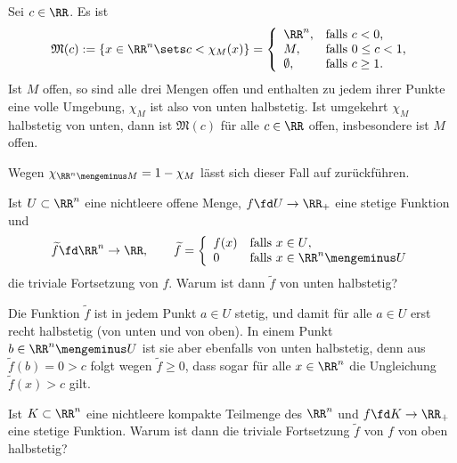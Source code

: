 \begin{antwort}
   Sei $c\in \RR$. Es ist 
  \[
  \mathfrak{M}(c) := \{ x\in \RR^n \sets c < \chi_M(x) \} = \left\{ 
    \begin{array}{lll} \RR^n, & \text{falls $c<0$,} \\
      M, & \text{falls $0\le c < 1$,} \\
      \emptyset, & \text{falls $c \ge 1$.}
    \end{array}\right.
  \]
  Ist $M$ offen, so sind alle drei Mengen offen und enthalten 
  zu jedem ihrer Punkte eine volle Umgebung, $\chi_M$ ist also 
  von unten halbstetig. Ist umgekehrt $\chi_M$ halbstetig 
  von unten, dann ist $\mathfrak{M}(c)$ für alle $c \in \RR$ offen, 
  insbesondere ist $M$ offen. 

   Wegen $\chi_{\RR^n\mengeminus M}=1-\chi_M$ lässt sich dieser 
  Fall auf  zurückführen.\AntEnd
  
\end{antwort}

\begin{frage}\label{11_foff}
  Ist $U\subset \RR^n$ eine nichtleere offene Menge, 
  $f\fd U\to\RR_+$ eine stetige Funktion und 
  \[
  \widetilde{f} \fd \RR^n \to\RR, \qquad 
  \widetilde{f} = \left\{ \begin{array}{ll}
      f(x) & \text{falls $x\in U$}, \\
      0    & \text{falls $x\in \RR^n \mengeminus U$}
    \end{array} \right.
  \]
  die triviale Fortsetzung von $f$. 
  Warum ist dann $\widetilde{f}$ von unten halbstetig?
\end{frage}

\begin{antwort}
  Die Funktion $\widetilde{f}$ ist in jedem Punkt $a\in U$ stetig, 
  und damit f\"ur alle $a\in U$ erst recht halbstetig 
  (von unten und  von oben). 
  In einem Punkt $b\in \RR^n \mengeminus U$ ist sie aber ebenfalls von unten  
  halbstetig, denn aus $\widetilde{f}(b) =0 > c$ folgt wegen 
  $\widetilde{f} \ge 0$, dass sogar f\"ur alle $x\in \RR^n$ die Ungleichung 
  $\widetilde{f}(x)>c$ gilt. 
  \AntEnd
\end{antwort} 

\begin{frage}\label{11_fkom}
  Ist $K\subset\RR^n$ eine nichtleere kompakte Teilmenge des 
  $\RR^n$ und 
  $f\fd K \to \RR_+$ eine stetige Funktion. 
  Warum ist dann die triviale Fortsetzung 
  $\widetilde{f}$ von $f$ von oben halbstetig?
\end{frage}

